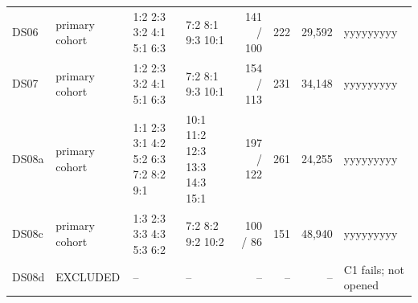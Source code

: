 \documentclass[10pt]{article}
\begin{document}
{\begin{longtable}{llp{3.2cm}p{2.6cm}rrrl}
DS06 & primary cohort & 1:2 2:3 3:2 4:1 5:1 6:3 & 7:2 8:1 9:3 10:1 & 141 / 100 & 222 & 29,592 & yyyyyyyyy \\
DS07 & primary cohort & 1:2 2:3 3:2 4:1 5:1 6:3 & 7:2 8:1 9:3 10:1 & 154 / 113 & 231 & 34,148 & yyyyyyyyy \\
DS08a & primary cohort & 1:1 2:3 3:1 4:2 5:2 6:3 7:2 8:2 9:1 & 10:1 11:2 12:3 13:3 14:3 15:1 & 197 / 122 & 261 & 24,255 & yyyyyyyyy \\
DS08c & primary cohort & 1:3 2:3 3:3 4:3 5:3 6:2 & 7:2 8:2 9:2 10:2 & 100 / 86 & 151 & 48,940 & yyyyyyyyy \\
DS08d & EXCLUDED & -- & -- & -- & -- & -- & C1 fails; not opened \\
\end{longtable}
\vspace{-0.6em}
}
\end{document}
